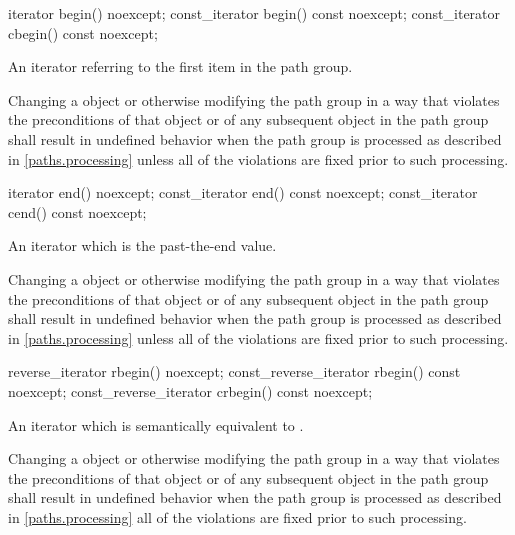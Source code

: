 \begin{itemdecl}
	iterator begin() noexcept;
	const_iterator begin() const noexcept;
	const_iterator cbegin() const noexcept;
\end{itemdecl}
\begin{itemdescr}
	\pnum
	\returns
	An iterator referring to the first  item in the path group.
	
	\pnum
	\remarks
	Changing a  object or otherwise modifying the path group in a way that violates the preconditions of that  object or of any subsequent  object in the path group shall result in undefined behavior when the path group is processed as described in \ref{paths.processing} unless all of the violations are fixed prior to such processing.
\end{itemdescr}

\begin{itemdecl}
	iterator end() noexcept;
	const_iterator end() const noexcept;
	const_iterator cend() const noexcept;
\end{itemdecl}
\begin{itemdescr}
	\pnum
	\returns
	An iterator which is the past-the-end value.
	
	\pnum
	\remarks
	Changing a  object or otherwise modifying the path group in a way that violates the preconditions of that  object or of any subsequent  object in the path group shall result in undefined behavior when the path group is processed as described in \ref{paths.processing} unless all of the violations are fixed prior to such processing.
\end{itemdescr}

\begin{itemdecl}
	reverse_iterator rbegin() noexcept;
	const_reverse_iterator rbegin() const noexcept;
	const_reverse_iterator crbegin() const noexcept;
\end{itemdecl}
\begin{itemdescr}
	\pnum
	\returns
	An iterator which is semantically equivalent to .
	
	\pnum
	\remarks
	Changing a  object or otherwise modifying the path group in a way that violates the preconditions of that  object or of any subsequent  object in the path group shall result in undefined behavior when the path group is processed as described in \ref{paths.processing} all of the violations are fixed prior to such processing.
\end{itemdescr}

